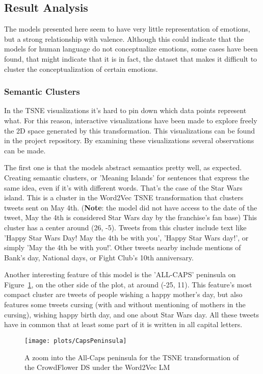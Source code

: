 \subsection{Result Analysis}\label{sub:Result Analysis}
The models presented here seem to have very little representation of emotions, but a strong relationship with valence. Although this could indicate that the models for human language do not conceptualize emotions, some cases have been found, that might indicate that it is in fact, the dataset that makes it difficult to cluster the conceptualization of certain emotions.

\subsubsection{Semantic Clusters}
In the TSNE visualizations it's hard to pin down which data points represent what. For this reason, interactive visualizations have been made to explore freely the 2D space generated by this transformation. This visualizations can be found in the project repository. By examining these visualizations several observations can be made.

The first one is that the models abstract semantics pretty well, as expected. Creating semantic clusters, or 'Meaning Islands' for sentences that express the same idea, even if it's with different words. That's the case of the Star Wars island. This is a cluster in the Word2Vec TSNE transformation that clusters tweets sent on May 4th. (\textbf{Note}: the model did not have access to the date of the tweet, May the 4th is considered Star Wars day by the franchise's fan base) This cluster has a center around (26, -5). Tweets from this cluster include text like 'Happy Star Wars Day! May the 4th be with you', 'Happy Star Wars day!', or simply 'May the 4th be with you!'. Other tweets nearby include mentions of Bank's day, National days, or Fight Club's 10th anniversary.

Another interesting feature of this model is the 'ALL-CAPS' peninsula on Figure~\ref{fig:CapsPeninsula}, on the other side of the plot, at around (-25, 11). This feature's most compact cluster are tweets of people wishing a happy mother's day, but also features some tweets cursing (with and without mentioning of mothers in the cursing), wishing happy birth day, and one about Star Wars day. All these tweets have in common that at least some part of it is written in all capital letters.

\begin{figure}[H]
  \texttt{[image: plots/CapsPeninsula]}
  \centering
  \caption{A zoom into the All-Caps peninsula for the TSNE transformation of the CrowdFlower DS under the Word2Vec LM}\label{fig:CapsPeninsula}
\end{figure}

